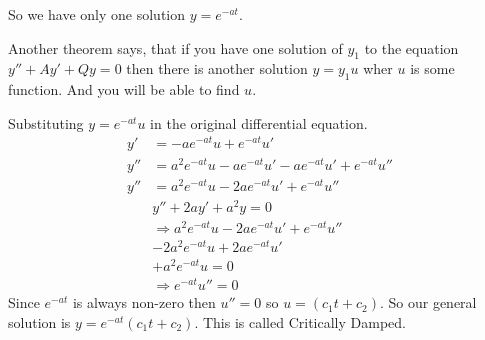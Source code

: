 So we have only one solution $y = e^{-at}$.

Another theorem says, that if you have one solution of $y_1$ to the equation $y'' + Ay' + Qy = 0$
then there is another solution $y = y_1 u$ wher $u$ is some function.
And you will be able to find $u$.

Substituting $y = e^{-at} u$ in the original differential equation.
\begin{align*}
    y' & = -ae^{-at} u + e^{-at} u' \\
    y'' & = a^2 e^{-at} u - a e^{-at} u' -a e^{-at} u' + e^{-at} u'' \\
    y'' & = a^2 e^{-at} u - 2 a e^{-at} u' + e^{-at} u'' \\
    & y'' + 2ay' + a^2y = 0 \\
    & \Rightarrow a^2 e^{-at} u - 2 a e^{-at} u' + e^{-at} u'' \\
    & - 2 a^2 e^{-at} u + 2a e^{-at} u' \\
    & + a^2 e^{-at} u = 0 \\
    & \Rightarrow e^{-at} u'' = 0
\end{align*}
Since $e^{-at}$ is always non-zero then $u'' = 0$ so $u = (c_1t + c_2)$.
So our general solution is $y = e^{-at}(c_1t + c_2)$.
This is called Critically Damped.
